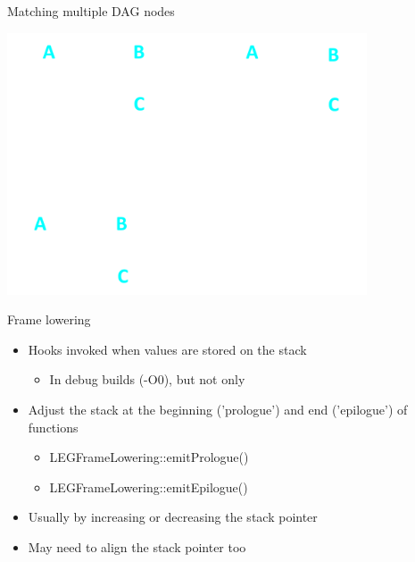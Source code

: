 
\begin{frame}[fragile]{Matching multiple DAG nodes}

\includegraphics[width = 0.80\textwidth]{examples/ex3-selection1.png}

\end{frame}


\begin{frame}{Frame lowering}

\begin{itemize}
    \item Hooks invoked when values are stored on the stack
    \begin{itemize}
        \item In debug builds (-O0), but not only
    \end{itemize}
    \item Adjust the stack at the beginning ('prologue') and end ('epilogue') of functions
    \begin{itemize}
        \item LEGFrameLowering::emitPrologue()
        \item LEGFrameLowering::emitEpilogue()
    \end{itemize}
    \item Usually by increasing or decreasing the stack pointer
    \item May need to align the stack pointer too
\end{itemize}

\end{frame}

